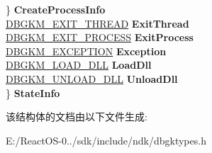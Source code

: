 \begin{DoxyCompactItemize}
\begin{tabbing}
\>\} {\bfseries CreateProcessInfo}\\
\>\hyperlink{struct___d_b_g_k_m___e_x_i_t___t_h_r_e_a_d}{DBGKM\_EXIT\_THREAD} {\bfseries ExitThread}\\
\>\hyperlink{struct___d_b_g_k_m___e_x_i_t___p_r_o_c_e_s_s}{DBGKM\_EXIT\_PROCESS} {\bfseries ExitProcess}\\
\>\hyperlink{struct___d_b_g_k_m___e_x_c_e_p_t_i_o_n}{DBGKM\_EXCEPTION} {\bfseries Exception}\\
\>\hyperlink{struct___d_b_g_k_m___l_o_a_d___d_l_l}{DBGKM\_LOAD\_DLL} {\bfseries LoadDll}\\
\>\hyperlink{struct___d_b_g_k_m___u_n_l_o_a_d___d_l_l}{DBGKM\_UNLOAD\_DLL} {\bfseries UnloadDll}\\
\} {\bfseries StateInfo}\\

\end{tabbing}\end{DoxyCompactItemize}


该结构体的文档由以下文件生成\+:\begin{DoxyCompactItemize}
\item 
E\+:/\+React\+O\+S-\/0../sdk/include/ndk/dbgktypes.\+h\end{DoxyCompactItemize}
